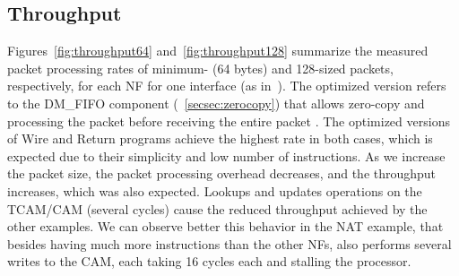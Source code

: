 
\subsection{Throughput}
\label{secsec:throughput}

Figures~\ref{fig:throughput64} and~\ref{fig:throughput128} summarize the measured packet processing rates of minimum- (64 bytes) and 128-sized packets, respectively, for each NF for one interface (as in~\cite{FlowBlaze2019}). The optimized version refers to the DM\_FIFO component (\textsection~\ref{secsec:zerocopy}) that allows zero-copy and processing the packet before receiving the entire packet . The optimized versions of Wire and Return programs achieve the highest rate in both cases, which is expected due to their simplicity and low number of instructions. As we increase the packet size, the packet processing overhead decreases, and the throughput increases, which was also expected. Lookups and updates operations on the TCAM/CAM (several cycles) cause the reduced throughput achieved by the other examples. We can observe better this behavior in the NAT example, that besides having much more instructions than the other NFs, also performs several writes to the CAM, each taking 16 cycles each and stalling the processor.

